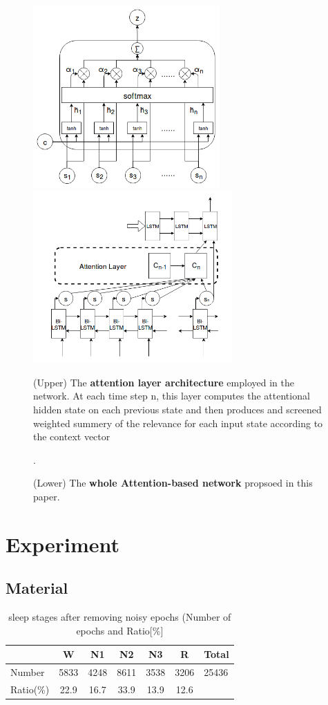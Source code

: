 \documentclass[journal]{IEEEtran}
\begin{document}
\begin{figure}[!t]
\centering
\includegraphics[width=2.8in]{fig_01.png}
\includegraphics[width=3in]{fig_02.png}
\caption{(Upper) The \textbf{attention layer architecture} employed in the network. At each time step n, this layer computes the attentional hidden state on each previous state and then produces and screened weighted summery of the relevance for each input state according to the context vector}
\caption{(Lower) The \textbf{whole Attention-based network} propsoed in this paper.}. 
\end{figure}


\section{Experiment}
\subsection{Material}

\begin{table}[!t]
\renewcommand{\arraystretch}{1.3}
\caption{sleep stages after removing noisy epochs (Number of epochs and Ratio[\%]}
\centering
\begin{tabular}{lcccccl}
\toprule
  & W & N1 & N2 & N3 & R & Total \\
\midrule
 Number & 5833 & 4248 & 8611 & 3538 & 3206 & 25436\\
 Ratio(\%) & 22.9 & 16.7 & 33.9 & 13.9 & 12.6 &\\ 
\end{tabular}
\end{table}
\end{document}
